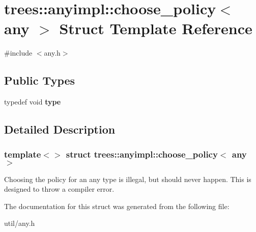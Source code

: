 \hypertarget{structtrees_1_1anyimpl_1_1choose__policy_3_01any_01_4}{}\section{trees\+:\+:anyimpl\+:\+:choose\+\_\+policy$<$ any $>$ Struct Template Reference}
\label{structtrees_1_1anyimpl_1_1choose__policy_3_01any_01_4}


{\ttfamily \#include $<$any.\+h$>$}

\subsection*{Public Types}
\begin{DoxyCompactItemize}
\item 
\mbox{\label{structtrees_1_1anyimpl_1_1choose__policy_3_01any_01_4_a2d661f31e7a16ed78096e4a2bcdf365d}} 
typedef void {\bfseries type}
\end{DoxyCompactItemize}


\subsection{Detailed Description}
\subsubsection*{template$<$$>$\newline
struct trees\+::anyimpl\+::choose\+\_\+policy$<$ any $>$}

Choosing the policy for an any type is illegal, but should never happen. This is designed to throw a compiler error. 

The documentation for this struct was generated from the following file\+:\begin{DoxyCompactItemize}
\item 
util/any.\+h\end{DoxyCompactItemize}
